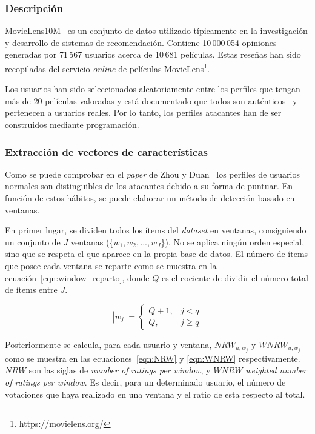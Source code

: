\subsubsection{Descripción}

MovieLens10M~\cite{groupLensDatasets} es un conjunto de datos utilizado típicamente en la investigación y desarrollo de sistemas de recomendación. Contiene 10\,000\,054 opiniones generadas por 71\,567 usuarios acerca de 10\,681 películas. Estas reseñas han sido recopiladas del servicio \textit{online} de películas MovieLens\footnote{https://movielens.org/}.

Los usuarios han sido seleccionados aleatoriamente entre los perfiles que tengan más de 20 películas valoradas y está documentado que todos son auténticos~\cite{zhou2021SemisupervisedRecommendationAttack} y pertenecen a usuarios reales. Por lo tanto, los perfiles atacantes han de ser construidos mediante programación.

\subsubsection{Extracción de vectores de características}

Como se puede comprobar en el \textit{paper} de Zhou y Duan~\cite{zhou2021SemisupervisedRecommendationAttack} los perfiles de usuarios normales son distinguibles de los atacantes debido a su forma de puntuar. En función de estos hábitos, se puede elaborar un método de detección basado en ventanas.

En primer lugar, se dividen todos los ítems del \textit{dataset} en ventanas, consiguiendo un conjunto de $J$ ventanas (\{$w_1, w_2, ..., w_J$\}). No se aplica ningún orden especial, sino que se respeta el que aparece en la propia base de datos. El número de ítems que posee cada ventana se reparte como se muestra en la ecuación~\ref{eqn:window_reparto}, donde $Q$ es el cociente de dividir el número total de ítems entre $J$.
	
\[|w_j| = \left\{ \begin{array}{lr} Q + 1, & j < q\\ Q, & j \ge q \label{eqn:window_reparto} \end{array} \right. \] 

Posteriormente se calcula, para cada usuario y ventana, $NRW_{u, w_j}$ y  $WNRW_{u, w_j}$ como se muestra en las ecuaciones~\ref{eqn:NRW} y \ref{eqn:WNRW} respectivamente. $NRW$ son las siglas de \textit{number of ratings per window}, y $WNRW$ \textit{weighted number of ratings per window}. Es decir, para un determinado usuario, el número de votaciones que haya realizado en una ventana y el ratio de esta respecto al total.

